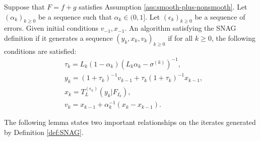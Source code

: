 \documentclass[12pt]{article}
\begin{document}
    \begin{definition}\label{def:SNAG}
        Suppose that $F = f + g$ satisfies Assumption \ref{ass:smooth-plus-nonsmooth}. 
        Let $(\alpha_k)_{k \ge 0}$ be a sequence such that $\alpha_k \in (0, 1]$. 
        Let $(\epsilon_k)_{k \ge 0}$ be a sequence of errors. 
        Given initial conditions $v_{-1}, x_{- 1}$. 
        An algorithm satisfying the SNAG definition if it generates a sequence $(y_k, x_k, v_k)_{k \ge 0}$ if for all $k \ge 0$, the following conditions are satisfied: 
        \begin{align*}
            & \tau_k = L_k(1 - \alpha_k)\left(L_k \alpha_k - \sigma^{(k)}\right)^{-1}, \\
            & y_k = (1 + \tau_k)^{-1}v_{k - 1} + \tau_k(1 + \tau_k)^{-1}x_{k - 1}, \\
            & x_k =  T_{L}^{(\epsilon_k)}(y_k | F_{I_k}), \\
            & v_k = x_{k - 1} + \alpha_k^{-1}(x_k - x_{k - 1}).
        \end{align*}
    \end{definition}
    The following lemma states two important relationships on the iterates generated by Definition \ref{def:SNAG}. 
    \begin{lemma}\label{lemma:snag-identities}
        
    \end{lemma}





\end{document}
